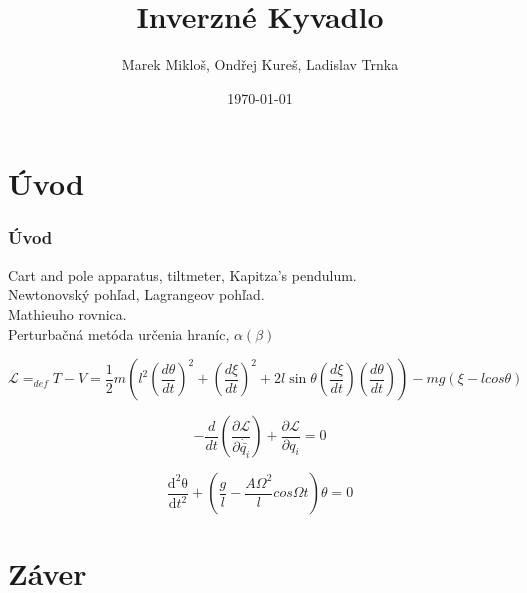 \documentclass{beamer}
\title[Mechanika]{Inverzné Kyvadlo}
\author[Skupina Z] {Marek Mikloš, Ondřej Kureš, Ladislav Trnka \\ }
\institute[Charles University]{Charles University, Czech Republic}
\date{\today}
\begin{document}

\section*{Úvod}
\label{sec: Int}


\begin{frame}
 
 \frametitle{Úvod}
 \begin{center}
 Cart and pole apparatus, tiltmeter, Kapitza's pendulum.\\    
 Newtonovský pohľad, Lagrangeov pohľad.\\
 Mathieuho rovnica.\\
 Perturbačná metóda určenia hraníc, $\alpha(\beta)$ \\
 \end{center}

 \begin{equation*}
\mathcal{L}=_{def}T-V=\frac{1}{2}m(l^2(\frac{d\theta}{dt})^2+(\frac{d\xi}{dt})^2+2l\sin\theta(\frac{d\xi}{dt})(\frac{d\theta}{dt}))-mg(\xi-lcos{\theta})
 \end{equation*}

 \begin{equation*}
 -\frac{d}{dt}(\frac{\partial\mathcal{L}}{\partial\dot{\bar{q_{i}}}})+ \frac{\partial\mathcal{L}}{\partial{}q_{i}}=0
 \end{equation*}
 
 \begin{equation*}
 \frac{\mathrm{d^2\theta} }{\mathrm{d} t^2}+(\frac{g}{l}-\frac{A{\Omega}^2}{l}cos{\Omega t})\theta=0
 \end{equation*}
 
\end{frame}
 

\section*{Záver}
\label{sec:Záver}
\end{document}
